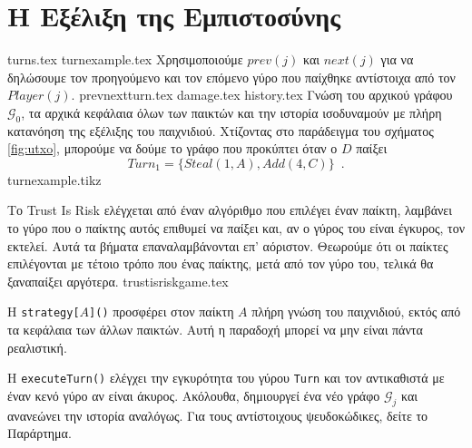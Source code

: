 \section{Η Εξέλιξη της Εμπιστοσύνης}
  {turns.tex}
  {turnexample.tex}
  Χρησιμοποιούμε $prev\left(j\right)$ και $next\left(j\right)$ για να δηλώσουμε τον προηγούμενο και τον επόμενο γύρο που
  παίχθηκε αντίστοιχα από τον $Player\left(j\right)$.
  {prevnextturn.tex}
  {damage.tex}
  {history.tex}
  Γνώση του αρχικού γράφου $\mathcal{G}_0$, τα αρχικά κεφάλαια όλων των παικτών και την ιστορία ισοδυναμούν με πλήρη κατανόηση
  της εξέλιξης του παιχνιδιού. Χτίζοντας στο παράδειγμα του σχήματος \ref{fig:utxo}, μπορούμε να δούμε το γράφο που προκύπτει
  όταν ο $D$ παίξει
  \begin{equation}
  \label{turnexample}
     Turn_1 = \{Steal\left(1, A\right), Add\left(4, C\right)\} \enspace.
  \end{equation}
  {turnexample.tikz}

  Το \textlatin{Trust Is Risk} ελέγχεται από έναν αλγόριθμο που επιλέγει έναν παίκτη, λαμβάνει το γύρο που ο παίκτης αυτός
  επιθυμεί να παίξει και, αν ο γύρος του είναι έγκυρος, τον εκτελεί. Αυτά τα βήματα επαναλαμβάνονται επ' αόριστον. Θεωρούμε
  ότι οι παίκτες επιλέγονται με τέτοιο τρόπο που ένας παίκτης, μετά από τον γύρο του, τελικά θα ξαναπαίξει αργότερα.
  {trustisriskgame.tex}

  Η \textlatin{\texttt{strategy[}$A$\texttt{]()}} προσφέρει στον παίκτη $A$ πλήρη γνώση του παιχνιδιού, εκτός από τα κεφάλαια των άλλων
  παικτών. Αυτή η παραδοχή μπορεί να μην είναι πάντα ρεαλιστική.

  Η \textlatin{\texttt{executeTurn()}} ελέγχει την εγκυρότητα του γύρου \texttt{\textlatin{Turn}} και τον αντικαθιστά με έναν
  κενό γύρο αν είναι άκυρος. Ακόλουθα, δημιουργεί ένα νέο γράφο $\mathcal{G}_j$ και ανανεώνει την ιστορία αναλόγως. Για τους
  αντίστοιχους ψευδοκώδικες, δείτε το Παράρτημα.
